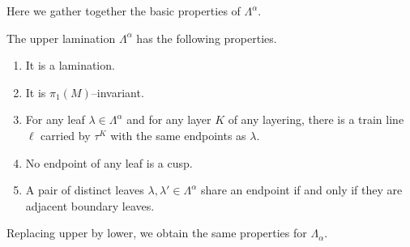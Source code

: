 \documentclass[12pt]{amsart}
\begin{document}
Here we gather together the basic properties of $\Lambda^\alpha$.

\begin{lemma}
\label{Lem:Laminations}
The upper lamination $\Lambda^\alpha$ has the following properties. 
\begin{enumerate}
\item
\label{Itm:NoLinking}
It is a lamination.
\item
\label{Itm:PiOneInvariant}
It is $\pi_1(M)$--invariant.  
\item 
\label{Itm:LeavesAreCarried}
For any leaf $\lambda \in \Lambda^\alpha$ and for any layer $K$ of any layering, there is a train line $\ell$ carried by $\tau^K$ with the same endpoints as $\lambda$.  
\item
\label{Itm:Irrational}
No endpoint of any leaf is a cusp.
\item
\label{Itm:Asymptotic}
A pair of distinct leaves $\lambda, \lambda' \in \Lambda^\alpha$ share an endpoint if and only if they are adjacent boundary leaves.
\end{enumerate}
Replacing upper by lower, we obtain the same properties for $\Lambda_\alpha$.
\end{lemma}
\end{document}
